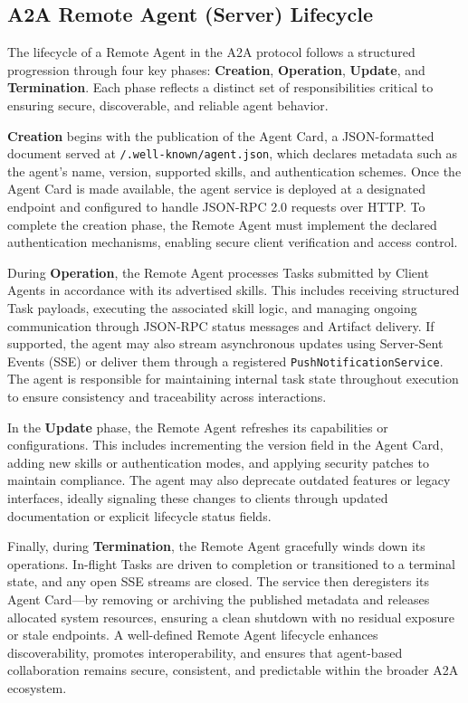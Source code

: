 \documentclass{article}
\begin{document}
\subsection{A2A Remote Agent (Server) Lifecycle}

The lifecycle of a Remote Agent in the A2A protocol follows a structured progression through four key phases: \textbf{Creation}, \textbf{Operation}, \textbf{Update}, and \textbf{Termination}. Each phase reflects a distinct set of responsibilities critical to ensuring secure, discoverable, and reliable agent behavior.

\textbf{Creation} begins with the publication of the Agent Card, a JSON-formatted document served at \texttt{/.well-known/agent.json}, which declares metadata such as the agent’s name, version, supported skills, and authentication schemes. Once the Agent Card is made available, the agent service is deployed at a designated endpoint and configured to handle JSON-RPC 2.0 requests over HTTP. To complete the creation phase, the Remote Agent must implement the declared authentication mechanisms, enabling secure client verification and access control.

During \textbf{Operation}, the Remote Agent processes Tasks submitted by Client Agents in accordance with its advertised skills. This includes receiving structured Task payloads, executing the associated skill logic, and managing ongoing communication through JSON-RPC status messages and Artifact delivery. If supported, the agent may also stream asynchronous updates using Server-Sent Events (SSE) or deliver them through a registered \texttt{PushNotificationService}. The agent is responsible for maintaining internal task state throughout execution to ensure consistency and traceability across interactions.

In the \textbf{Update} phase, the Remote Agent refreshes its capabilities or configurations. This includes incrementing the version field in the Agent Card, adding new skills or authentication modes, and applying security patches to maintain compliance. The agent may also deprecate outdated features or legacy interfaces, ideally signaling these changes to clients through updated documentation or explicit lifecycle status fields.

Finally, during \textbf{Termination}, the Remote Agent gracefully winds down its operations. In-flight Tasks are driven to completion or transitioned to a terminal state, and any open SSE streams are closed. The service then deregisters its Agent Card—by removing or archiving the published metadata and releases allocated system resources, ensuring a clean shutdown with no residual exposure or stale endpoints. A well-defined Remote Agent lifecycle enhances discoverability, promotes interoperability, and ensures that agent-based collaboration remains secure, consistent, and predictable within the broader A2A ecosystem.
\end{document}
